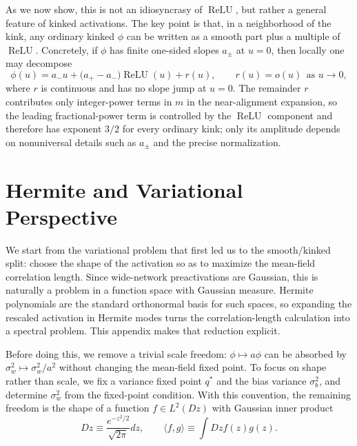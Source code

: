 \documentclass{article}
\DeclareMathOperator{\ReLU}{ReLU}
\newcommand{\relu}{\ensuremath{\ReLU}}
\theoremstyle{plain}
\theoremstyle{definition}
\theoremstyle{remark}
\begin{document}
As we now show, this is not an idiosyncrasy of \relu{}, but rather a general feature of kinked activations. The key point is that, in a neighborhood of the kink, any ordinary kinked $\phi$ can be written as a smooth part plus a multiple of \relu{}. Concretely, if $\phi$ has finite one-sided slopes $a_\pm$ at $u=0$, then locally one may decompose
\relax
\begin{equation}
\phi(u)=a_- u+\big(a_+-a_-\big) \ReLU(u)+r(u), \qquad r(u)=o(u)\ \ \text{as }u\to 0,
\end{equation}
\relax
where $r$ is continuous and has no slope jump at $u=0$. The remainder $r$ contributes only integer-power terms in $m$ in the near-alignment expansion, so the leading fractional-power term is controlled by the \relu{} component and therefore has exponent $3/2$ for every ordinary kink; only its amplitude depends on nonuniversal details such as $a_\pm$ and the precise normalization.










\section{Hermite and Variational Perspective}
\label{sec:var-opt-act}

We start from the variational problem that first led us to the smooth/kinked split: choose the shape of the activation so as to maximize the mean-field correlation length. Since wide-network preactivations are Gaussian, this is naturally a problem in a function space with Gaussian measure. Hermite polynomials are the standard orthonormal basis for such spaces, so expanding the rescaled activation in Hermite modes turns the correlation-length calculation into a spectral problem. This appendix makes that reduction explicit.

Before doing this, we remove a trivial scale freedom: $\phi \mapsto a \phi$ can be absorbed by $\sigma_w^2 \mapsto \sigma_w^2/a^2$ without changing the mean-field fixed point. To focus on shape rather than scale, we fix a variance fixed point $q^*$ and the bias variance $\sigma_b^2$, and determine $\sigma_w^2$ from the fixed-point condition. With this convention, the remaining freedom is the shape of a function $f \in L^2(Dz)$ with Gaussian inner product
\relax
\begin{equation}
Dz \equiv \frac{e^{-z^2/2}}{\sqrt{2\pi}} dz, \qquad \langle f,g\rangle \equiv \int Dz f(z) g(z).
\end{equation}
\relax
\end{document}
